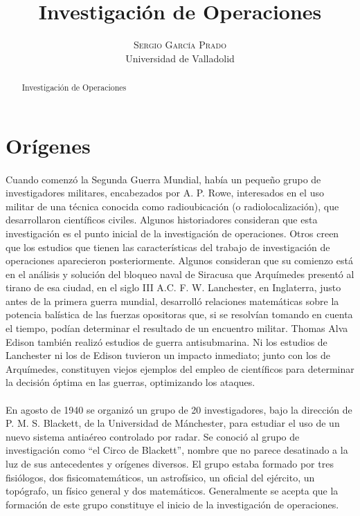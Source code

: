 \documentclass[12pt, a4paper,spanish]{article}
\title{\vspace{-15mm}\fontsize{24pt}{10pt}\selectfont\textbf{Investigación de Operaciones}} %
\author{
\large
\textsc{Sergio García Prado}\\[2mm] %
\normalsize Universidad de Valladolid \\ %
\vspace{-5mm}
}
\date{}
\begin{document}
	\maketitle %

	\thispagestyle{fancy} %


	\begin{abstract}
		\noindent Investigación de Operaciones
	\end{abstract}

	\section{Orígenes}

		\paragraph{}
		Cuando comenzó la Segunda Guerra Mundial, había un pequeño grupo de investigadores militares, encabezados por A. P. Rowe, interesados en el uso militar de una técnica conocida como radioubicación (o radiolocalización), que desarrollaron científicos civiles. Algunos historiadores consideran que esta investigación es el punto inicial de la investigación de operaciones. Otros creen que los estudios que tienen las características del trabajo de investigación de operaciones aparecieron posteriormente. Algunos consideran que su comienzo está en el análisis y solución del bloqueo naval de Siracusa que Arquímedes presentó al tirano de esa ciudad, en el siglo III A.C. F. W. Lanchester, en Inglaterra, justo antes de la primera guerra mundial, desarrolló relaciones matemáticas sobre la potencia balística de las fuerzas opositoras que, si se resolvían tomando en cuenta el tiempo, podían determinar el resultado de un encuentro militar. Thomas Alva Edison también realizó estudios de guerra antisubmarina. Ni los estudios de Lanchester ni los de Edison tuvieron un impacto inmediato; junto con los de Arquímedes, constituyen viejos ejemplos del empleo de científicos para determinar la decisión óptima en las guerras, optimizando los ataques. \cite{wikipedia_IO}

		\paragraph{}
		En agosto de 1940 se organizó un grupo de 20 investigadores, bajo la dirección de P. M. S. Blackett, de la Universidad de Mánchester, para estudiar el uso de un nuevo sistema antiaéreo controlado por radar. Se conoció al grupo de investigación como “el Circo de Blackett”, nombre que no parece desatinado a la luz de sus antecedentes y orígenes diversos. El grupo estaba formado por tres fisiólogos, dos fisicomatemáticos, un astrofísico, un oficial del ejército, un topógrafo, un físico general y dos matemáticos. Generalmente se acepta que la formación de este grupo constituye el inicio de la investigación de operaciones. \cite{wikipedia_IO}
\end{document}
